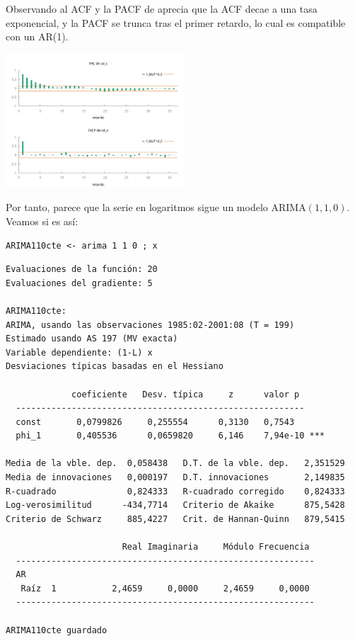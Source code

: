 \documentclass[10pt]{article}
\begin{document}
Observando al ACF y la PACF de aprecia que la ACF decae a una tasa
exponencial, y la PACF se trunca tras el primer retardo, lo cual es
compatible con un AR(1).

\begin{center}
\includegraphics[width=0.5\textwidth]{./SegundoEjercicioIdentificacionARIMA/sd_x_ACF-PACF.png}
\end{center}

Por tanto, parece que la serie en logaritmos sigue un modelo
ARIMA\((1,1,0)\). Veamos si es así:

\begin{verbatim}
ARIMA110cte <- arima 1 1 0 ; x 
\end{verbatim}

\begin{verbatim}
Evaluaciones de la función: 20
Evaluaciones del gradiente: 5

ARIMA110cte:
ARIMA, usando las observaciones 1985:02-2001:08 (T = 199)
Estimado usando AS 197 (MV exacta)
Variable dependiente: (1-L) x
Desviaciones típicas basadas en el Hessiano

             coeficiente   Desv. típica     z      valor p 
  ---------------------------------------------------------
  const       0,0799826     0,255554      0,3130   0,7543  
  phi_1       0,405536      0,0659820     6,146    7,94e-10 ***

Media de la vble. dep.  0,058438   D.T. de la vble. dep.   2,351529
Media de innovaciones   0,000197   D.T. innovaciones       2,149835
R-cuadrado              0,824333   R-cuadrado corregido    0,824333
Log-verosimilitud      -434,7714   Criterio de Akaike      875,5428
Criterio de Schwarz     885,4227   Crit. de Hannan-Quinn   879,5415

                       Real Imaginaria     Módulo Frecuencia
  -----------------------------------------------------------
  AR
   Raíz  1           2,4659     0,0000     2,4659     0,0000
  -----------------------------------------------------------

ARIMA110cte guardado
\end{verbatim}
\end{document}
